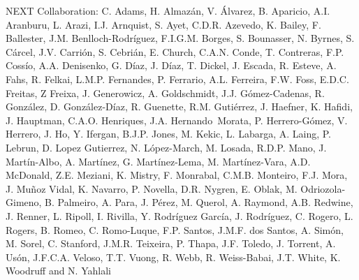 NEXT Collaboration: C. Adams, H. Almaz\'an, V. \'Alvarez, B. Aparicio, A.I. Aranburu, L. Arazi, I.J. Arnquist, S. Ayet, C.D.R. Azevedo, K. Bailey, F. Ballester, J.M. Benlloch-Rodr\'{i}guez, F.I.G.M. Borges, S. Bounasser, N. Byrnes, S. C\'arcel, J.V. Carri\'on, S. Cebri\'an, E. Church, C.A.N. Conde, T. Contreras, F.P. Coss\'io, A.A. Denisenko, G. D\'iaz, J. D\'iaz, T. Dickel, J. Escada, R. Esteve, A. Fahs, R. Felkai, L.M.P. Fernandes, P. Ferrario, A.L. Ferreira, F.W. Foss, E.D.C. Freitas, Z Freixa, J. Generowicz, A. Goldschmidt, J.J. G\'omez-Cadenas, R. Gonz\'alez, D. Gonz\'alez-D\'iaz, R. Guenette, R.M. Guti\'errez, J. Haefner, K. Hafidi, J. Hauptman, C.A.O. Henriques, J.A. Hernando~Morata, P. Herrero-G\'omez, V. Herrero, J. Ho, Y. Ifergan, B.J.P. Jones, M. Kekic, L. Labarga, A. Laing, P. Lebrun, D. Lopez Gutierrez, N. L\'opez-March, M. Losada, R.D.P. Mano, J. Mart\'in-Albo, A. Mart\'inez, G. Mart\'inez-Lema, M. Mart\'inez-Vara, A.D. McDonald, Z.E. Meziani, K. Mistry, F. Monrabal, C.M.B. Monteiro, F.J. Mora, J. Mu\~noz Vidal, K. Navarro, P. Novella, D.R. Nygren, E. Oblak, M. Odriozola-Gimeno, B. Palmeiro, A. Para, J. P\'erez, M. Querol, A. Raymond, A.B. Redwine, J. Renner, L. Ripoll, I. Rivilla, Y. Rodr\'iguez Garc\'ia, J. Rodr\'iguez, C. Rogero, L. Rogers, B. Romeo, C. Romo-Luque, F.P. Santos, J.M.F. dos Santos, A. Sim\'on, M. Sorel, C. Stanford, J.M.R. Teixeira, P. Thapa, J.F. Toledo, J. Torrent, A. Us\'on, J.F.C.A. Veloso, T.T. Vuong, R. Webb, R. Weiss-Babai, J.T. White, K. Woodruff and N. Yahlali